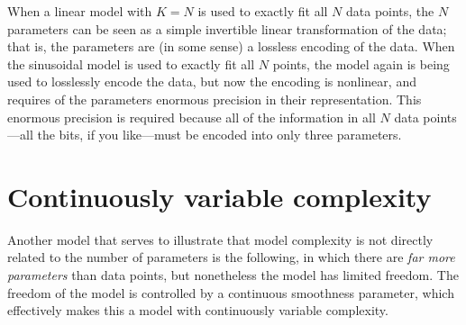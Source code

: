 \documentclass[12pt,twoside]{article}
\begin{document}
When a linear model with $K=N$ is used to exactly fit all $N$ data
points, the $N$ parameters can be seen as a simple invertible linear
transformation of the data; that is, the parameters are (in some
sense) a lossless encoding of the data.  When the sinusoidal model is
used to exactly fit all $N$ points, the model again is being used to
losslessly encode the data, but now the encoding is nonlinear, and
requires of the parameters enormous precision in their representation.
This enormous precision is required because all of the information in
all $N$ data points---all the bits, if you like---must be encoded into
only three parameters.

\section{Continuously variable complexity}

Another model that serves to illustrate that model complexity is not
directly related to the number of parameters is the following, in
which there are \emph{far more parameters} than data points, but
nonetheless the model has limited freedom.  The freedom of the model
is controlled by a continuous smoothness parameter, which effectively
makes this a model with continuously variable complexity.
\end{document}
